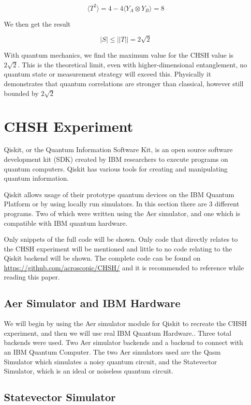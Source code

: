 \documentclass[12pt]{article}
\begin{document}
\[
\langle T^2 \rangle = 4 - 4 \langle Y_A \otimes Y_B \rangle = 8
\]

We then get the result

\[
|S| \leq ||T|| = 2 \sqrt{2}
\]

With quantum mechanics, we find the maximum value for the CHSH value is $2\sqrt{2}$. This is the theoretical limit, even with higher-dimensional entanglement, no quantum state or measurement strategy will exceed this. Physically it demonstrates that quantum correlations are stronger than classical, however still bounded by $2\sqrt{2}$

\newpage
\section{CHSH Experiment}
Qiskit, or the Quantum Information Software Kit, is an open source software development kit (SDK) created by IBM researchers to execute programs on quantum computers.
Qiskit has various tools for creating and manipulating quantum information. 

Qiskit allows usage of their prototype quantum devices on the IBM Quantum Platform or by using locally run simulators. In this section there are 3 different programs. Two of which were written using the Aer simulator, and one which is compatible with IBM quantum hardware.

Only snippets of the full code will be shown. Only code that directly relates to the CHSH experiment will be mentioned and little to no code relating to the Qiskit backend will be shown. The complete code can be found on \url{https://github.com/acroscopic/CHSH/} and it is recommended to reference while reading this paper.

\subsection{Aer Simulator and IBM Hardware}
We will begin by using the Aer simulator module for Qiskit to recreate the CHSH experiment, and then we will use real IBM Quantum Hardware.\cite{qiskit}. Three total backends were used. Two Aer simulator backends and a backend to connect with an IBM Quantum Computer. The two Aer simulators used are the Qasm Simulator which simulates a noisy quantum circuit, and the Statevector Simulator, which is an ideal or noiseless quantum circuit.

\subsection{Statevector Simulator}
\end{document}
